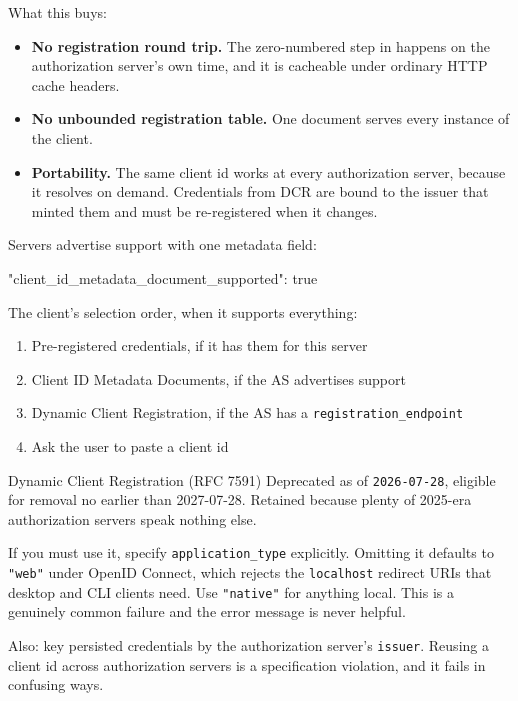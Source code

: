 What this buys:

\begin{itemize}[leftmargin=1.6em, itemsep=3pt]
\item \textbf{No registration round trip.} The zero-numbered step in
 happens on the authorization server's own time, and it is
cacheable under ordinary HTTP cache headers.
\item \textbf{No unbounded registration table.} One document serves every
instance of the client.
\item \textbf{Portability.} The same client id works at every authorization
server, because it resolves on demand. Credentials from DCR are bound to the
issuer that minted them and must be re-registered when it changes.
\end{itemize}

Servers advertise support with one metadata field:

\begin{wire}
{ "client_id_metadata_document_supported": true }
\end{wire}

The client's selection order, when it supports everything:

\begin{enumerate}[leftmargin=1.6em, itemsep=2pt]
\item Pre-registered credentials, if it has them for this server
\item Client ID Metadata Documents, if the AS advertises support
\item Dynamic Client Registration, if the AS has a \texttt{registration\_endpoint}
\item Ask the user to paste a client id
\end{enumerate}

\begin{legacybox}{Dynamic Client Registration (RFC 7591)}
Deprecated as of \texttt{2026-07-28}, eligible for removal no earlier than
2027-07-28. Retained because plenty of 2025-era authorization servers speak
nothing else.

If you must use it, specify \texttt{application\_type} explicitly. Omitting it
defaults to \texttt{"web"} under OpenID Connect, which rejects the
\texttt{localhost} redirect URIs that desktop and CLI clients need. Use
\texttt{"native"} for anything local. This is a genuinely common failure and the
error message is never helpful.

Also: key persisted credentials by the authorization server's \texttt{issuer}.
Reusing a client id across authorization servers is a specification violation,
and it fails in confusing ways.
\end{legacybox}

